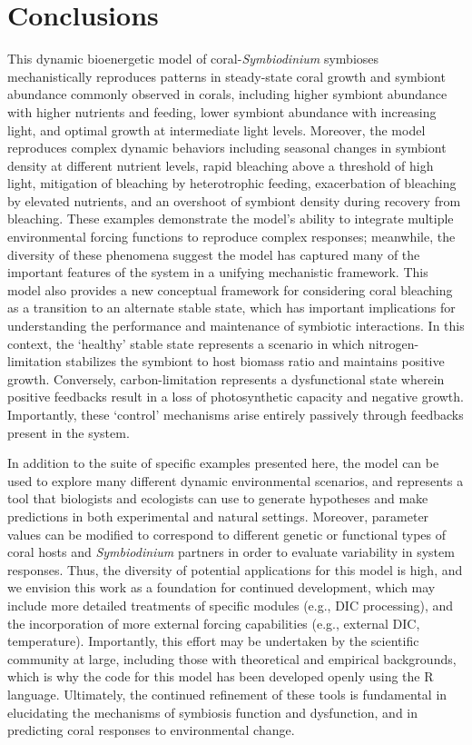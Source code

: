 \documentclass[]{elsarticle} %
\begin{document}
\section{Conclusions}\label{conclusions}

This dynamic bioenergetic model of coral-\emph{Symbiodinium} symbioses
mechanistically reproduces patterns in steady-state coral growth and
symbiont abundance commonly observed in corals, including higher
symbiont abundance with higher nutrients and feeding, lower symbiont
abundance with increasing light, and optimal growth at intermediate
light levels. Moreover, the model reproduces complex dynamic behaviors
including seasonal changes in symbiont density at different nutrient
levels, rapid bleaching above a threshold of high light, mitigation of
bleaching by heterotrophic feeding, exacerbation of bleaching by
elevated nutrients, and an overshoot of symbiont density during recovery
from bleaching. These examples demonstrate the model's ability to
integrate multiple environmental forcing functions to reproduce complex
responses; meanwhile, the diversity of these phenomena suggest the model
has captured many of the important features of the system in a unifying
mechanistic framework. This model also provides a new conceptual
framework for considering coral bleaching as a transition to an
alternate stable state, which has important implications for
understanding the performance and maintenance of symbiotic interactions.
In this context, the `healthy' stable state represents a scenario in
which nitrogen-limitation stabilizes the symbiont to host biomass ratio
and maintains positive growth. Conversely, carbon-limitation represents
a dysfunctional state wherein positive feedbacks result in a loss of
photosynthetic capacity and negative growth. Importantly, these
`control' mechanisms arise entirely passively through feedbacks present
in the system.

In addition to the suite of specific examples presented here, the model
can be used to explore many different dynamic environmental scenarios,
and represents a tool that biologists and ecologists can use to generate
hypotheses and make predictions in both experimental and natural
settings. Moreover, parameter values can be modified to correspond to
different genetic or functional types of coral hosts and
\emph{Symbiodinium} partners in order to evaluate variability in system
responses. Thus, the diversity of potential applications for this model
is high, and we envision this work as a foundation for continued
development, which may include more detailed treatments of specific
modules (e.g., DIC processing), and the incorporation of more external
forcing capabilities (e.g., external DIC, temperature). Importantly,
this effort may be undertaken by the scientific community at large,
including those with theoretical and empirical backgrounds, which is why
the code for this model has been developed openly using the R language.
Ultimately, the continued refinement of these tools is fundamental in
elucidating the mechanisms of symbiosis function and dysfunction, and in
predicting coral responses to environmental change.
\end{document}
